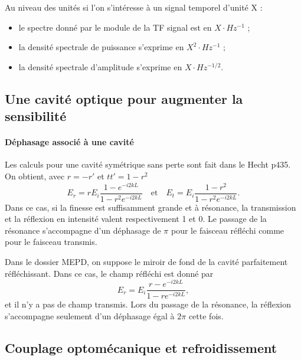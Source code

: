 \documentclass[12pt,a4paper]{article}
\begin{document}
Au niveau des unités si l'on s'intéresse à un signal temporel d'unité X :
\begin{itemize}
\item le spectre donné par le module de la TF signal est en $\unit{}{X\cdot Hz^{-1}}$ ;
\item la densité spectrale de puissance s'exprime en $\unit{}{X^2\cdot Hz^{-1}}$ ;
\item la densité spectrale d'amplitude s'exprime en $\unit{}{X\cdot Hz^{-1/2}}$.
\end{itemize}


\subsection{Une cavité optique pour augmenter la sensibilité}
\label{sec:cavity}

\paragraph{Déphasage associé à une cavité\\}
Les calculs pour une cavité symétrique sans perte sont fait dans le Hecht p435.
On obtient, avec $r=-r'$ et $tt'=1-r^2$
\begin{equation}
E_r = rE_i \frac{1-e^{-i2kL}}{1-r^2e^{-i2kL}} \quad \mathrm{et} \quad
E_t = E_i \frac{1-r^2}{1-r^2e^{-i2kL}}.
\end{equation}
Dans ce cas, si la finesse est suffisamment grande et à résonance, la transmission et la réflexion en intensité valent respectivement 1 et 0.
Le passage de la résonance s'accompagne d'un déphasage de $\pi$ pour le faisceau réfléchi comme pour le faisceau transmis.

Dans le dossier MEPD, on suppose le miroir de fond de la cavité parfaitement réfléchissant.
Dans ce cas, le champ réfléchi est donné par 
\begin{equation}
E_r = E_i \frac{r-e^{-i2kL}}{1-re^{-i2kL}},
\end{equation}
et il n'y a pas de champ transmis.
Lors du passage de la résonance, la réflexion s'accompagne seulement d'un déphasage égal à $2\pi$ cette fois.

\subsection{Couplage optomécanique et refroidissement}
\label{sec:optomechanics}
\end{document}
